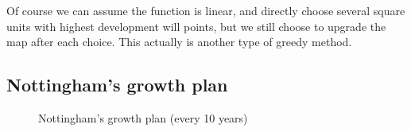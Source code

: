Of course we can assume the function is linear, and directly choose several square units with highest development will points, but we still choose to upgrade the map after each choice.
This actually is another type of greedy method.\\

\subsection{Nottingham's growth plan}
\begin{figure}[htb]
  \label{fig:nottingham-diff}
  \centering
  \caption{Nottingham's growth plan (every 10 years)}
\end{figure}
